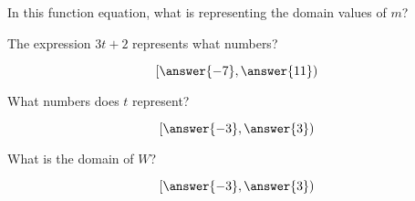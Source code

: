 \documentclass{ximera}
\begin{document}
\begin{example}
\begin{question}

In this function equation, what is representing the domain values of $m$?

\begin{multipleChoice}
\end{multipleChoice}



The expression $3t + 2$ represents what numbers?


\[
\left[ \answer{-7}, \answer{11} \right)
\]


What numbers does $t$ represent?


\[
\left[ \answer{-3}, \answer{3} \right)
\]


\end{question}



\begin{question}

What is the domain of $W$?



\[
\left[ \answer{-3}, \answer{3} \right)
\]
\end{question}



\end{example}
\end{document}
